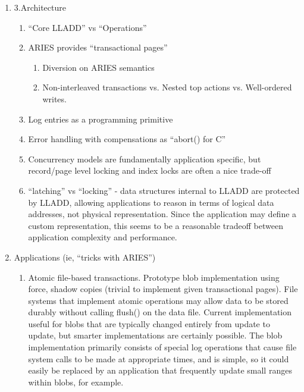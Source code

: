 \documentclass[letterpaper,english]{article}
\begin{document}
\begin{enumerate}
\begin{enumerate}
\end{enumerate}

\item 3.Architecture 

\begin{enumerate}

  \item {}``Core LLADD'' vs {}``Operations''

  \item ARIES provides {}``transactional pages'' 

\begin{enumerate}

  \item Diversion on ARIES semantics
  
  \item Non-interleaved transactions vs. Nested top actions
  vs. Well-ordered writes.

\end{enumerate}

  \item Log entries as a programming primitive 

  \item Error handling with compensations as {}``abort() for C''

  \item Concurrency models are fundamentally application specific, but
  record/page level locking and index locks are often a nice trade-off

  \item {}``latching'' vs {}``locking'' - data structures internal to
  LLADD are protected by LLADD, allowing applications to reason in
  terms of logical data addresses, not physical representation. Since
  the application may define a custom representation, this seems to be
  a reasonable tradeoff between application complexity and
  performance.

\end{enumerate}

\item Applications (ie, {}``tricks with ARIES'') 

\begin{enumerate}

  \item Atomic file-based transactions. Prototype blob implementation
  using force, shadow copies (trivial to implement given transactional
  pages).  File systems that implement atomic operations may allow
  data to be stored durably without calling flush() on the data
  file. Current implementation useful for blobs that are typically
  changed entirely from update to update, but smarter implementations
  are certainly possible. The blob implementation primarily consists
  of special log operations that cause file system calls to be made at
  appropriate times, and is simple, so it could easily be replaced by
  an application that frequently update small ranges within blobs, for
  example.


\end{enumerate}
\end{enumerate}
\end{document}
